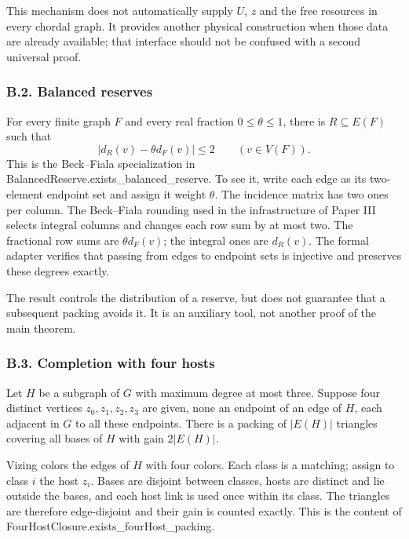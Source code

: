 \documentclass[english,11pt,a4paper]{article}
\newcounter{none}
\begin{document}
This mechanism does not automatically supply \(U\), \(z\) and the free resources in every chordal graph. It provides another physical construction when those data are already available; that interface should not be confused with a second universal proof.

\subsubsection{B.2. Balanced reserves}\label{b.2.-balanced-reserves}

For every finite graph \(F\) and every real fraction \(0\le\theta\le1\), there is \(R\subseteq E(F)\) such that \[
|d_R(v)-\theta d_F(v)|\le2\qquad(v\in V(F)).
\tag{B.4}
\] This is the Beck--Fiala specialization in {\ttfamily\small BalancedRese\discretionary{\hbox{\ensuremath{\hookrightarrow}}}{}{}rve.\discretionary{\hbox{\ensuremath{\hookrightarrow}}}{}{}exists\_\discretionary{\hbox{\ensuremath{\hookrightarrow}}}{}{}balanced\_\discretionary{\hbox{\ensuremath{\hookrightarrow}}}{}{}reserve}. To see it, write each edge as its two-element endpoint set and assign it weight \(\theta\). The incidence matrix has two ones per column. The Beck--Fiala rounding used in the infrastructure of Paper III selects integral columns and changes each row sum by at most two. The fractional row sums are \(\theta d_F(v)\); the integral ones are \(d_R(v)\). The formal adapter verifies that passing from edges to endpoint sets is injective and preserves these degrees exactly.

The result controls the distribution of a reserve, but does not guarantee that a subsequent packing avoids it. It is an auxiliary tool, not another proof of the main theorem.

\subsubsection{B.3. Completion with four hosts}\label{b.3.-completion-with-four-hosts}

Let \(H\) be a subgraph of \(G\) with maximum degree at most three. Suppose four distinct vertices \(z_0,z_1,z_2,z_3\) are given, none an endpoint of an edge of \(H\), each adjacent in \(G\) to all these endpoints. There is a packing of \(|E(H)|\) triangles covering all bases of \(H\) with gain \(2|E(H)|\).

Vizing colors the edges of \(H\) with four colors. Each class is a matching; assign to class \(i\) the host \(z_i\). Bases are disjoint between classes, hosts are distinct and lie outside the bases, and each host link is used once within its class. The triangles are therefore edge-disjoint and their gain is counted exactly. This is the content of {\ttfamily\small FourHostClos\discretionary{\hbox{\ensuremath{\hookrightarrow}}}{}{}ure.\discretionary{\hbox{\ensuremath{\hookrightarrow}}}{}{}exists\_\discretionary{\hbox{\ensuremath{\hookrightarrow}}}{}{}fourHost\_\discretionary{\hbox{\ensuremath{\hookrightarrow}}}{}{}packing}.
\end{document}
